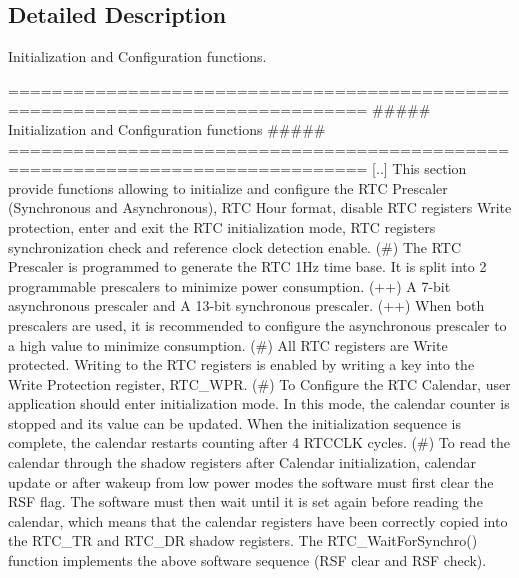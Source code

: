 \subsection{Detailed Description}
Initialization and Configuration functions. \begin{DoxyVerb} ===============================================================================
            ##### Initialization and Configuration functions #####
 ===============================================================================  
    [..] This section provide functions allowing to initialize and configure the RTC
         Prescaler (Synchronous and Asynchronous), RTC Hour format, disable RTC registers
         Write protection, enter and exit the RTC initialization mode, RTC registers
         synchronization check and reference clock detection enable.
         (#) The RTC Prescaler is programmed to generate the RTC 1Hz time base. It is
             split into 2 programmable prescalers to minimize power consumption.
             (++) A 7-bit asynchronous prescaler and A 13-bit synchronous prescaler.
             (++) When both prescalers are used, it is recommended to configure the 
                  asynchronous prescaler to a high value to minimize consumption.
         (#) All RTC registers are Write protected. Writing to the RTC registers
             is enabled by writing a key into the Write Protection register, RTC_WPR.
         (#) To Configure the RTC Calendar, user application should enter initialization
             mode. In this mode, the calendar counter is stopped and its value 
             can be updated. When the initialization sequence is complete, the 
             calendar restarts counting after 4 RTCCLK cycles.
         (#) To read the calendar through the shadow registers after Calendar 
             initialization, calendar update or after wakeup from low power modes 
             the software must first clear the RSF flag. The software must then 
             wait until it is set again before reading the calendar, which means 
             that the calendar registers have been correctly copied into the RTC_TR 
             and RTC_DR shadow registers. The RTC_WaitForSynchro() function 
             implements the above software sequence (RSF clear and RSF check).\end{DoxyVerb}


